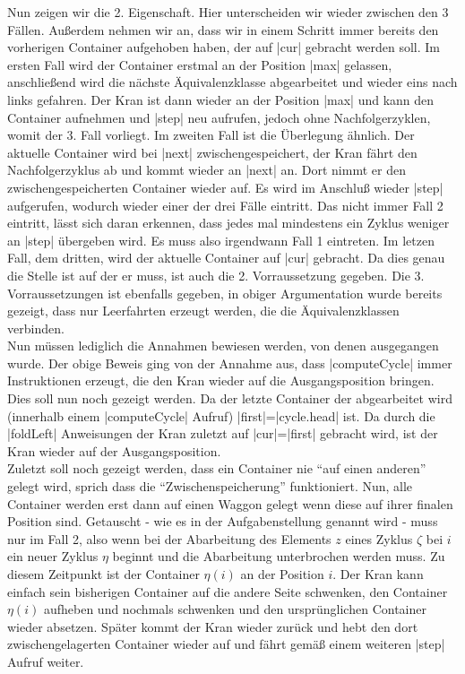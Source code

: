 Nun zeigen wir die 2. Eigenschaft. Hier unterscheiden wir wieder zwischen den 3 Fällen.
Außerdem nehmen wir an, dass wir in einem Schritt immer bereits den vorherigen Container aufgehoben haben, der auf |cur| gebracht werden soll.
Im ersten Fall wird der Container erstmal an der Position |max| gelassen, anschließend wird die nächste Äquivalenzklasse abgearbeitet und wieder eins nach links gefahren.
Der Kran ist dann wieder an der Position |max| und kann den Container aufnehmen und |step| neu aufrufen, jedoch ohne Nachfolgerzyklen, womit der 3. Fall vorliegt.
Im zweiten Fall ist die Überlegung ähnlich. Der aktuelle Container wird bei |next| zwischengespeichert, der Kran fährt den Nachfolgerzyklus ab und kommt wieder an |next| an.
Dort nimmt er den zwischengespeicherten Container wieder auf.
Es wird im Anschluß wieder |step| aufgerufen, wodurch wieder einer der drei Fälle eintritt.
Das nicht immer Fall 2 eintritt, lässt sich daran erkennen, dass jedes mal mindestens ein Zyklus weniger an |step| übergeben wird.
Es muss also irgendwann Fall 1 eintreten.
Im letzen Fall, dem dritten, wird der aktuelle Container auf |cur| gebracht.
Da dies genau die Stelle ist auf der er muss, ist auch die 2. Vorraussetzung gegeben.
Die 3. Vorraussetzungen ist ebenfalls gegeben, in obiger Argumentation wurde bereits gezeigt, dass nur Leerfahrten erzeugt werden, die die Äquivalenzklassen verbinden.
\\%

Nun müssen lediglich die Annahmen bewiesen werden, von denen ausgegangen wurde.
Der obige Beweis ging von der Annahme aus, dass |computeCycle| immer Instruktionen erzeugt, die den Kran wieder auf die Ausgangsposition bringen.
Dies soll nun noch gezeigt werden. Da der letzte Container der abgearbeitet wird (innerhalb einem |computeCycle| Aufruf) |first|=|cycle.head| ist.
Da durch die |foldLeft| Anweisungen der Kran zuletzt auf |cur|=|first| gebracht wird, ist der Kran wieder auf der Ausgangsposition.\\
Zuletzt soll noch gezeigt werden, dass ein Container nie ``auf einen anderen'' gelegt wird, sprich dass die ``Zwischenspeicherung'' funktioniert.
Nun, alle Container werden erst dann auf einen Waggon gelegt wenn diese auf ihrer finalen Position sind.
Getauscht - wie es in der Aufgabenstellung genannt wird - muss nur im Fall 2,
also wenn bei der Abarbeitung des Elements $z$ eines Zyklus $\zeta$ bei $i$ ein neuer Zyklus $\eta$ beginnt und die Abarbeitung unterbrochen werden muss.
Zu diesem Zeitpunkt ist der Container $\eta(i)$ an der Position $i$. Der Kran kann einfach sein bisherigen Container auf die andere Seite schwenken, den Container $\eta(i)$
aufheben und nochmals schwenken und den ursprünglichen Container wieder absetzen.
Später kommt der Kran wieder zurück und hebt den dort zwischengelagerten Container wieder auf und fährt gemäß einem weiteren |step| Aufruf weiter.

